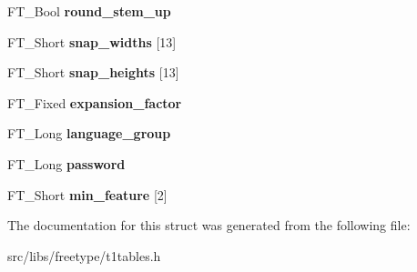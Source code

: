 \begin{DoxyCompactItemize}
\item 
\hypertarget{struct_p_s___private_rec___a96b9729811d02146a87ffdc5c254bbe9}{
FT\_\-Bool {\bfseries round\_\-stem\_\-up}}
\label{struct_p_s___private_rec___a96b9729811d02146a87ffdc5c254bbe9}

\item 
\hypertarget{struct_p_s___private_rec___a39cf1a4b21280bf8082ccba0f4824a8a}{
FT\_\-Short {\bfseries snap\_\-widths} \mbox{[}13\mbox{]}}
\label{struct_p_s___private_rec___a39cf1a4b21280bf8082ccba0f4824a8a}

\item 
\hypertarget{struct_p_s___private_rec___a3583caf0cc05de2afac098574ed0bc4b}{
FT\_\-Short {\bfseries snap\_\-heights} \mbox{[}13\mbox{]}}
\label{struct_p_s___private_rec___a3583caf0cc05de2afac098574ed0bc4b}

\item 
\hypertarget{struct_p_s___private_rec___a45cf6e07c4c26f029e66998e6cad9fa0}{
FT\_\-Fixed {\bfseries expansion\_\-factor}}
\label{struct_p_s___private_rec___a45cf6e07c4c26f029e66998e6cad9fa0}

\item 
\hypertarget{struct_p_s___private_rec___afc2a7f950a174577ebfc062bb1598f5c}{
FT\_\-Long {\bfseries language\_\-group}}
\label{struct_p_s___private_rec___afc2a7f950a174577ebfc062bb1598f5c}

\item 
\hypertarget{struct_p_s___private_rec___a309a871cdeb6f658d8fbff23fa13b667}{
FT\_\-Long {\bfseries password}}
\label{struct_p_s___private_rec___a309a871cdeb6f658d8fbff23fa13b667}

\item 
\hypertarget{struct_p_s___private_rec___af8c829e03c424b1f12b2c9cd4041a868}{
FT\_\-Short {\bfseries min\_\-feature} \mbox{[}2\mbox{]}}
\label{struct_p_s___private_rec___af8c829e03c424b1f12b2c9cd4041a868}

\end{DoxyCompactItemize}


The documentation for this struct was generated from the following file:\begin{DoxyCompactItemize}
\item 
src/libs/freetype/t1tables.h\end{DoxyCompactItemize}
